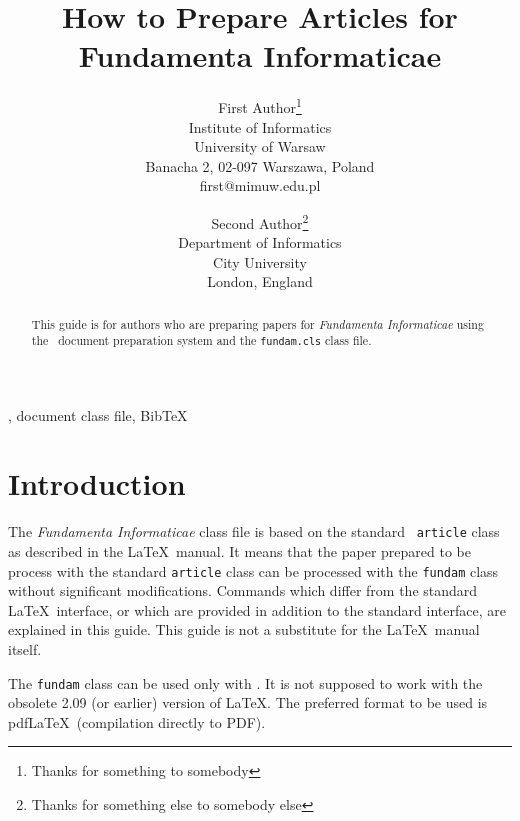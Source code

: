 \documentclass{fundam}
\begin{document}
\setcounter{page}{1001}

\title{How to Prepare Articles for Fundamenta Informaticae}

\address{Address for correspondence goes here}

\author{First Author\thanks{Thanks for something to somebody}\\
Institute of Informatics \\
University of Warsaw \\ Banacha 2, 02-097 Warszawa, Poland\\
first{@}mimuw.edu.pl
\and Second Author\thanks{Thanks for something else to somebody else}\\
Department of Informatics \\
City University \\
London, England } \maketitle


\begin{abstract}
  This guide is for authors who are preparing papers for
  \emph{Fundamenta Informaticae\/} using the \LaTeXe\ document
  preparation system and the \texttt{fundam.cls} class file.
\end{abstract}

\begin{keywords}
\LaTeXe, document class file, Bib\TeX
\end{keywords}


\section{Introduction}

The \emph{Fundamenta Informaticae\/} class file is based on the
standard \LaTeXe\ \texttt{article} class as described in the \LaTeX\
manual.  It means that the paper prepared to be process with the
standard \texttt{article} class can be processed with the
\texttt{fundam} class without significant modifications.  Commands which
differ from the standard \LaTeX\ interface, or which are provided in
addition to the standard interface, are explained in this guide. This
guide is not a substitute for the \LaTeX\ manual itself.

The \texttt{fundam} class can be used only with \LaTeXe. It is not
supposed to work with the obsolete 2.09 (or earlier) version of
\LaTeX. The preferred format to be used is pdf\LaTeX\  (compilation directly to PDF).
\end{document}
